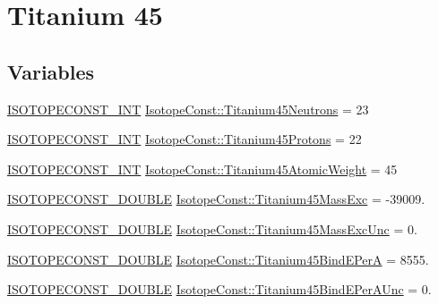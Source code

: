 \hypertarget{group___isotope_const-_titanium-_ti45}{}\section{Titanium 45}
\label{group___isotope_const-_titanium-_ti45}
\subsection*{Variables}
\begin{DoxyCompactItemize}
\item 
\mbox{\hyperlink{group___isotope_const-_macros_ga5f18360b3e99483a35c32d789e62621c}{I\+S\+O\+T\+O\+P\+E\+C\+O\+N\+S\+T\+\_\+\+I\+NT}} \mbox{\hyperlink{group___isotope_const-_titanium-_ti45_ga96f933f4380f1677647fd3df0a54759e}{Isotope\+Const\+::\+Titanium45\+Neutrons}} = 23
\item 
\mbox{\hyperlink{group___isotope_const-_macros_ga5f18360b3e99483a35c32d789e62621c}{I\+S\+O\+T\+O\+P\+E\+C\+O\+N\+S\+T\+\_\+\+I\+NT}} \mbox{\hyperlink{group___isotope_const-_titanium-_ti45_ga3e8bd2ff549eaf3e3949e6a307cdd9ef}{Isotope\+Const\+::\+Titanium45\+Protons}} = 22
\item 
\mbox{\hyperlink{group___isotope_const-_macros_ga5f18360b3e99483a35c32d789e62621c}{I\+S\+O\+T\+O\+P\+E\+C\+O\+N\+S\+T\+\_\+\+I\+NT}} \mbox{\hyperlink{group___isotope_const-_titanium-_ti45_gacc2f6e7e6000eda1fb7a813d3fe51984}{Isotope\+Const\+::\+Titanium45\+Atomic\+Weight}} = 45
\item 
\mbox{\hyperlink{group___isotope_const-_macros_ga8f45a7272ce02c0b4c65c44636ed719a}{I\+S\+O\+T\+O\+P\+E\+C\+O\+N\+S\+T\+\_\+\+D\+O\+U\+B\+LE}} \mbox{\hyperlink{group___isotope_const-_titanium-_ti45_gaa9b09c631058959424c82b60f0f2fa1c}{Isotope\+Const\+::\+Titanium45\+Mass\+Exc}} = -\/39009.
\item 
\mbox{\hyperlink{group___isotope_const-_macros_ga8f45a7272ce02c0b4c65c44636ed719a}{I\+S\+O\+T\+O\+P\+E\+C\+O\+N\+S\+T\+\_\+\+D\+O\+U\+B\+LE}} \mbox{\hyperlink{group___isotope_const-_titanium-_ti45_ga633bdfb9b1dd48e2c3f4def7ad7a4e5e}{Isotope\+Const\+::\+Titanium45\+Mass\+Exc\+Unc}} = 0.
\item 
\mbox{\hyperlink{group___isotope_const-_macros_ga8f45a7272ce02c0b4c65c44636ed719a}{I\+S\+O\+T\+O\+P\+E\+C\+O\+N\+S\+T\+\_\+\+D\+O\+U\+B\+LE}} \mbox{\hyperlink{group___isotope_const-_titanium-_ti45_ga76397de51980e59a2a8720adaf73d75c}{Isotope\+Const\+::\+Titanium45\+Bind\+E\+PerA}} = 8555.
\item 
\mbox{\hyperlink{group___isotope_const-_macros_ga8f45a7272ce02c0b4c65c44636ed719a}{I\+S\+O\+T\+O\+P\+E\+C\+O\+N\+S\+T\+\_\+\+D\+O\+U\+B\+LE}} \mbox{\hyperlink{group___isotope_const-_titanium-_ti45_ga6005e194d3213f3266a8ed6a0bc98b48}{Isotope\+Const\+::\+Titanium45\+Bind\+E\+Per\+A\+Unc}} = 0.

\end{DoxyCompactItemize}
